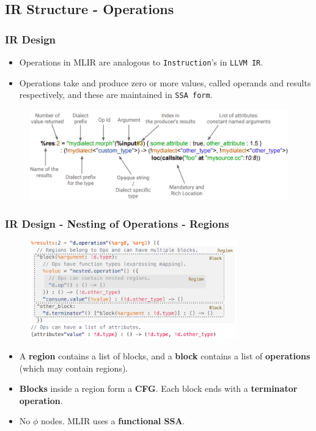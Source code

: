 \documentclass{beamer}
\begin{document}
\subsection{IR Structure - Operations}
\begin{frame}
  \frametitle{IR Design}
  \begin{itemize}
    \item Operations in MLIR are analogous to \texttt{Instruction}'s in \texttt{LLVM IR}.
    \item Operations take and produce zero or more values, called operands and results respectively, and
    these are maintained in \texttt{SSA form}.
  \end{itemize}
  \begin{figure}[h]
    \centering
    \includegraphics[width=\textwidth]{pictures/Operation.png}
  \end{figure}
\end{frame}

\begin{frame}
  \frametitle{IR Design - Nesting of Operations - Regions}
  \begin{figure}[h]
    \centering
    \includegraphics[width=0.8\textwidth]{pictures/BlockRegionOperation.png}
  \end{figure}
  \begin{itemize}
    \item A \textbf{region} contains a list of blocks, and a \textbf{block} contains a list of \textbf{operations} (which may contain regions).
    \item \textbf{Blocks} inside a region form a \textbf{CFG}. Each block ends with a \textbf{terminator operation}.
    \item No $\phi$ nodes. MLIR uses a \textbf{functional SSA}.
  \end{itemize}
\end{frame}
\end{document}
